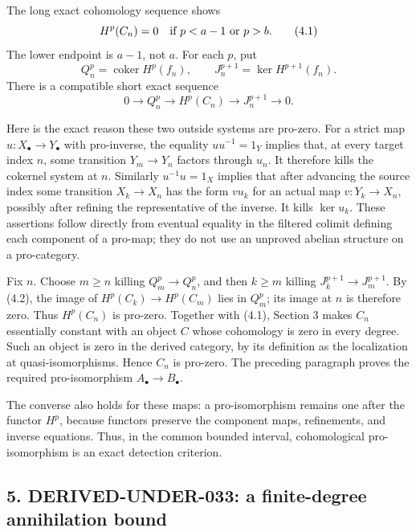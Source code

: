 The long exact cohomology sequence shows \[
H^p(C_n)=0\quad\hbox{if }p<a-1\hbox{ or }p>b. \tag{4.1}
\] The lower endpoint is \(a-1\),\allowbreak{} not \(a\). For each \(p\),\allowbreak{} put \[
Q_n^p=\operatorname{coker}H^p(f_n),\qquad
J_n^{p+1}=\ker H^{p+1}(f_n).
\] There is a compatible short exact sequence \[
0\longrightarrow Q_n^p\longrightarrow H^p(C_n)
 \longrightarrow J_n^{p+1}\longrightarrow0. \tag{4.2}
\]

Here is the exact reason these two outside systems are pro-zero. For a strict map \(u:X_\bullet\to Y_\bullet\) with pro-inverse,\allowbreak{} the equality \(u u^{-1}=1_Y\) implies that,\allowbreak{} at every target index \(n\),\allowbreak{} some transition \(Y_m\to Y_n\) factors through \(u_n\). It therefore kills the cokernel system at \(n\). Similarly \(u^{-1}u=1_X\) implies that after advancing the source index some transition \(X_k\to X_n\) has the form \(v u_k\) for an actual map \(v:Y_k\to X_n\),\allowbreak{} possibly after refining the representative of the inverse. It kills \(\ker u_k\). These assertions follow directly from eventual equality in the filtered colimit defining each component of a pro-map; they do not use an unproved abelian structure on a pro-category.

Fix \(n\). Choose \(m\geq n\) killing \(Q_m^p\to Q_n^p\),\allowbreak{} and then \(k\geq m\) killing \(J_k^{p+1}\to J_m^{p+1}\). By (4.2)\allowbreak{},\allowbreak{} the image of \(H^p(C_k)\to H^p(C_m)\) lies in \(Q_m^p\); its image at \(n\) is therefore zero. Thus \(H^p(C_n)\) is pro-zero. Together with (4.1)\allowbreak{},\allowbreak{} Section 3 makes \(C_n\) essentially constant with an object \(C\) whose cohomology is zero in every degree. Such an object is zero in the derived category,\allowbreak{} by its definition as the localization at quasi-isomorphisms. Hence \(C_n\) is pro-zero. The preceding paragraph proves the required pro-isomorphism \(A_\bullet\to B_\bullet\).

The converse also holds for these maps:\allowbreak{} a pro-isomorphism remains one after the functor \(H^p\),\allowbreak{} because functors preserve the component maps,\allowbreak{} refinements,\allowbreak{} and inverse equations. Thus,\allowbreak{} in the common bounded interval,\allowbreak{} cohomological pro-isomorphism is an exact detection criterion.

\subsection{\texorpdfstring{5. DERIVED-UNDER-033:\allowbreak{} a finite-degree annihilation bound}{5.  a finite-degree annihilation bound}}\label{proofs-12380-12604-derived-under-033-a-finite-degree-annihilation-bound}

